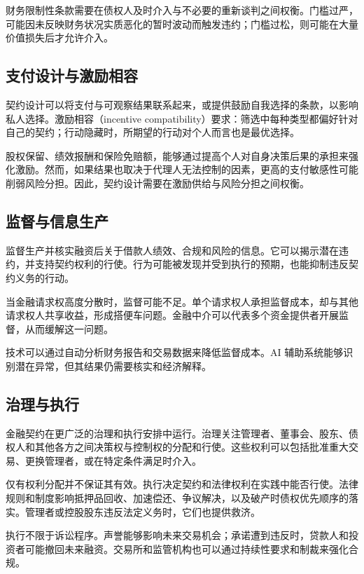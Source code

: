 财务限制性条款需要在债权人及时介入与不必要的重新谈判之间权衡。门槛过严，可能因未反映财务状况实质恶化的暂时波动而触发违约；门槛过松，则可能在大量价值损失后才允许介入。

\subsection{支付设计与激励相容}

契约设计可以将支付与可观察结果联系起来，或提供鼓励自我选择的条款，以影响私人选择。激励相容（incentive compatibility）要求：筛选中每种类型都偏好针对自己的契约；行动隐藏时，所期望的行动对个人而言也是最优选择。

股权保留、绩效报酬和保险免赔额，能够通过提高个人对自身决策后果的承担来强化激励。然而，如果结果也取决于代理人无法控制的因素，更高的支付敏感性可能削弱风险分担。因此，契约设计需要在激励供给与风险分担之间权衡。

\subsection{监督与信息生产}

监督生产并核实融资后关于借款人绩效、合规和风险的信息。它可以揭示潜在违约，并支持契约权利的行使。行为可能被发现并受到执行的预期，也能抑制违反契约义务的行动。

当金融请求权高度分散时，监督可能不足。单个请求权人承担监督成本，却与其他请求权人共享收益，形成搭便车问题。金融中介可以代表多个资金提供者开展监督，从而缓解这一问题。

技术可以通过自动分析财务报告和交易数据来降低监督成本。AI 辅助系统能够识别潜在异常，但其结果仍需要核实和经济解释。

\subsection{治理与执行}

金融契约在更广泛的治理和执行安排中运行。治理关注管理者、董事会、股东、债权人和其他各方之间决策权与控制权的分配和行使。这些权利可以包括批准重大交易、更换管理者，或在特定条件满足时介入。

仅有权利分配并不保证其有效。执行决定契约和法律权利在实践中能否行使。法律规则和制度影响抵押品回收、加速偿还、争议解决，以及破产时债权优先顺序的落实。管理者或控股股东违反法定义务时，它们也提供救济。

执行不限于诉讼程序。声誉能够影响未来交易机会；承诺遭到违反时，贷款人和投资者可能撤回未来融资。交易所和监管机构也可以通过持续性要求和制裁来强化合规。

